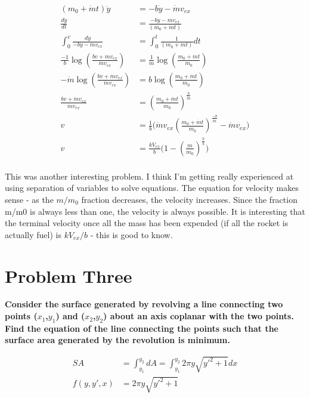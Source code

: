 \documentclass[10pt]{article} %
\begin{document}
\begin{align*}
  (m_0+\dot{m}t)\ddot{y} &= -b\dot{y} - \dot{m}v_{ex}\\
  \frac{d\dot{y}}{dt} &= \frac{-b\dot{y} - \dot{m}v_{ex}}{(m_0+\dot{m}t)}\\
  \int_0^v \frac{d\dot{y}}{-b\dot{y} - \dot{m}v_{ex}} &= \int_0^t \frac{1}{(m_0+\dot{m}t)}dt\\
  \frac{-1}{b}\log(\frac{bv + \dot{m}v_{ex}}{\dot{m}v_{ex}}) &= \frac{1}{\dot{m}}\log(\frac{m_0+\dot{m}t}{m_0})\\
  -\dot{m}\log(\frac{bv + \dot{m}v_{ex}}{\dot{m}v_{ex}}) &= b\log(\frac{m_0+\dot{m}t}{m_0})\\
  \frac{bv + \dot{m}v_{ex}}{\dot{m}v_{ex}} &= (\frac{m_0+\dot{m}t}{m_0})^{\frac{b}{\dot{m}}}\\
  v &= \frac{1}{b}\Big(\dot{m}v_{ex}(\frac{m_0+\dot{m}t}{m_0})^{\frac{-b}{\dot{m}}} - \dot{m}v_{ex}\Big)\\
  v &= \frac{kV_{ex}}{b}\Big(1 - (\frac{m}{m_0})^{\frac{b}{k}} \Big)\\
\end{align*}

This was another interesting problem. I think I'm getting really experienced at using separation of variables to solve equations. The equation for velocity makes sense - as the $m/m_0$ fraction decreases, the velocity increases. Since the fraction m/m0 is always less than one, the velocity is always possible. It is interesting that the terminal velocity once all the mass has been expended (if all the rocket is actually fuel) is $kV_{ex}/b$ - this is good to know.\\

\section{Problem Three}
\textbf{Consider the surface generated by revolving a line connecting two points ($x_1$,$y_1$) and ($x_2$,$y_2$) about an axis coplanar with the two points.  Find the equation of the line connecting the points such that the surface area generated by the revolution is minimum.}

\begin{align*}
  SA &= \int_{y_1}^{y_2} dA = \int_{y_1}^{y_2} 2\pi y\sqrt{y'^2+1}dx\\
  f(y, y', x) &= 2\pi y\sqrt{y'^2+1}\\
\end{align*}
\end{document}

